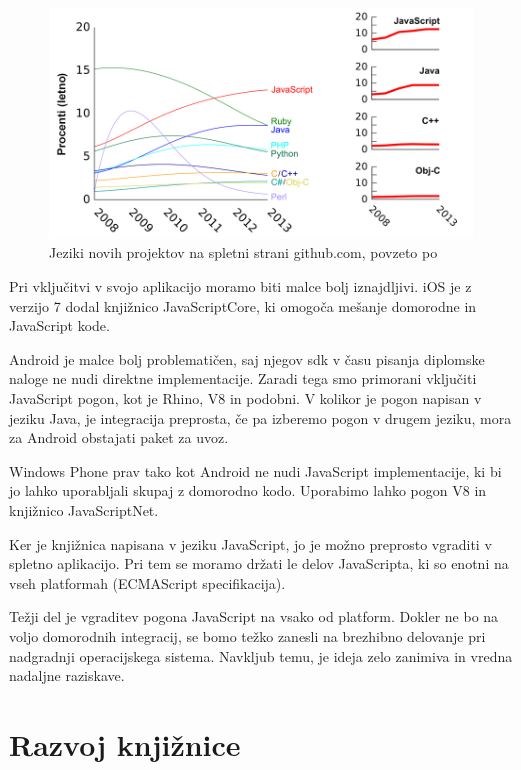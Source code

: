 \begin{figure}
 \includegraphics[width=\linewidth]{github-jeziki}
 \caption{Jeziki novih projektov na spletni strani github.com, povzeto po \cite{redmonk}}
 \label{fig:github-jeziki}
\end{figure}

Pri vključitvi v svojo aplikacijo moramo biti malce bolj iznajdljivi. iOS je z verzijo 7 dodal knjižnico JavaScriptCore, ki omogoča mešanje domorodne in JavaScript kode.

Android je malce bolj problematičen, saj njegov \gls{sdk} v času pisanja diplomske naloge ne nudi direktne implementacije. Zaradi tega smo primorani vključiti JavaScript pogon, kot je Rhino, V8 in podobni. V kolikor je pogon napisan v jeziku Java, je integracija preprosta, če pa izberemo pogon v drugem jeziku, mora za Android obstajati paket za uvoz.

Windows Phone prav tako kot Android ne nudi JavaScript implementacije, ki bi jo lahko uporabljali skupaj z domorodno kodo. Uporabimo lahko pogon V8 in knjižnico JavaScriptNet\cite{javascriptdotnet}.

Ker je knjižnica napisana v jeziku JavaScript, jo je možno preprosto vgraditi v spletno aplikacijo. Pri tem se moramo držati le delov JavaScripta, ki so enotni na vseh platformah (ECMAScript specifikacija).

Težji del je vgraditev pogona JavaScript na vsako od platform. Dokler ne bo na voljo domorodnih integracij, se bomo težko zanesli na brezhibno delovanje pri nadgradnji operacijskega sistema. Navkljub temu, je ideja zelo zanimiva in vredna nadaljne raziskave.

\chapter{Razvoj knjižnice}
\label{chap:development}

